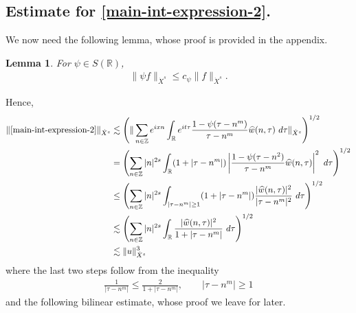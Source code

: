 \documentclass[12pt,reqno]{amsart}
\numberwithin{equation}{section}  %
\numberwithin{figure}{section}
\newcommand{\rr}{\mathbb{R}}
\newcommand{\zz}{\mathbb{Z}}
\newcommand{\wh}{\widehat}
\theoremstyle{plain}
\newtheorem{lemma}{Lemma}
\theoremstyle{definition}
\theoremstyle{remark}
\begin{document}
\subsection{Estimate for \eqref{main-int-expression-2}.}
We now need the following lemma, whose proof is provided in the appendix.
%
%
%
%
%
%
%
%
\begin{lemma}
\label{lem:schwartz-mult}
	For $\psi \in S(\rr)$,
%
%
\begin{equation}
	\label{schwartz-mult}
	\begin{split}
		\|\psi f \|_{\dot{X}^s} \le c_{\psi} \|f \|_{\dot{X}^s}.
	\end{split}
\end{equation}
%
%
\end{lemma}
%
%
Hence,
%
%
\begin{equation}
	\label{main-int2-est-X-s-part}
	\begin{split}
		\|\eqref{main-int-expression-2}\|_{\dot{X}^s} 
		& \lesssim 
		\left( \| \sum_{n \in \zz} e^{ixn} \int_\rr 
		e^{it \tau} \frac{ 1 - \psi (\tau - n^{m} ) 
		}{\tau - n^{m}} \wh{w}(n, \tau) \ 
		d \tau\|_{\dot{X}^s} \right)^{1/2}
		\\
		& =  \left( \sum_{n \in \zz} |n|^{2s} \int_\rr
		(1 + |\tau - n^{m}|) \left | \frac{1 - \psi(\tau - n^{2 
		})}{\tau - n^{m}} 
		\wh{w}(n, \tau) \right |^2 \ d 
		\tau \right)^{1/2}
		\\
		& \le \left( \sum_{n \in \zz} |n|^{2s} \int_{| \tau - n^{m }| \ge 1}
		(1 + |\tau - n^{m}|) \frac{|\wh{w}(n, \tau)|^2 }{|\tau - n^{m }|^2} 
		\ d 
		\tau \right)^{1/2}
		\\
		& \lesssim  \left( \sum_{n \in 
		\zz} |n|^{2s} \int_\rr
		\frac{|\wh{w}(n, \tau) |^2}{1+ |\tau - 
		n^{m}|} 
		 \ d \tau 
		\right)^{1/2}
		\\
		& \lesssim  \|u\|_{\dot{X}^s}^3
	\end{split}
\end{equation}
%
%
where the last two steps follow from the inequality 
%
\begin{equation}
	\label{one-plus-ineq}
	\begin{split}
		\frac{1}{|\tau - n^{m}| } \le \frac{2}{1 + |\tau - n^{m}| }, 
		\qquad |\tau - n^{m}| \ge 1
	\end{split}
\end{equation}
%
%
and the following bilinear estimate, whose proof we leave for later.
%
\end{document}
